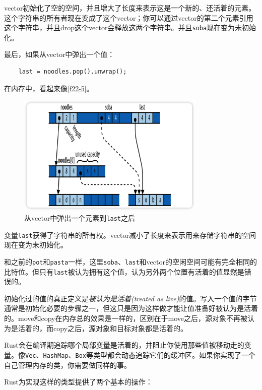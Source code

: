 vector初始化了空的空间，并且增大了长度来表示这是一个新的、还活着的元素。这个字符串的所有者现在变成了这个vector；你可以通过vector的第二个元素引用这个字符串，并且drop这个vector会释放这两个字符串。并且\texttt{soba}现在变为未初始化。

最后，如果从vector中弹出一个值：
\begin{verbatim}
    last = noodles.pop().unwrap();
\end{verbatim}

在内存中，看起来像\autoref{f22-5}。
\begin{figure}[htbp]
    \centering
    \includegraphics[width=0.8\textwidth]{../img/f22-5.png}
    \caption{从vector中弹出一个元素到\texttt{last}之后}
    \label{f22-5}
\end{figure}

变量\texttt{last}获得了字符串的所有权。vector减小了长度来表示用来存储字符串的空间现在变为未初始化。

和之前的\texttt{pot}和\texttt{pasta}一样，这里\texttt{soba}、\texttt{last}和vector的空闲空间可能有完全相同的比特位。但只有\texttt{last}被认为拥有这个值，认为另外两个位置有活着的值显然是错误的。

初始化过的值的真正定义是\emph{被认为是活着(treated as live)}的值。写入一个值的字节通常是初始化必要的步骤之一，但这只是因为这样做才能让值准备好被认为是活着的。move和copy在内存总的效果是一样的，区别在于move之后，源对象不再被认为是活着的，而copy之后，源对象和目标对象都是活着的。

Rust会在编译期追踪哪个局部变量是活着的，并阻止你使用那些值被移动走的变量。像\texttt{Vec}、\texttt{HashMap}、\texttt{Box}等类型都会动态追踪它们的缓冲区。如果你实现了一个自己管理内存的类，你需要做同样的事。

Rust为实现这样的类型提供了两个基本的操作：



